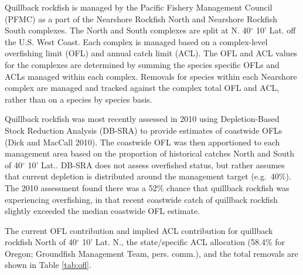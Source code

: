 \documentclass[11pt,
  english,
  a4paper,
]{article}
\begin{document}
\leavevmode\tagmcend\tagstructend


Quillback rockfish is managed by the Pacific Fishery Management Council (PFMC) as a part of the Nearshore Rockfish North and Nearshore Rockfish South complexes. The North and South complexes are split at N. 40{\(^\circ\)\leavevmode\tagmcend\tagstructend} 10' Lat. off the U.S. West Coast. Each complex is managed based on a complex-level overfishing limit (OFL) and annual catch limit (ACL). The OFL and ACL values for the complexes are determined by summing the species specific OFLs and ACLs managed within each complex. Removals for species within each Nearshore complex are managed and tracked against the complex total OFL and ACL, rather than on a species by species basis.

\leavevmode\tagmcend\tagstructend\par


Quillback rockfish was most recently assessed in 2010 using Depletion-Based Stock Reduction Analysis (DB-SRA) to provide estimates of coastwide OFLs {(Dick and MacCall 2010)\leavevmode\tagmcend\tagstructend}. The coastwide OFL was then apportioned to each management area based on the proportion of historical catches North and South of 40{\(^\circ\)\leavevmode\tagmcend\tagstructend} 10' Lat.. DB-SRA does not assess overfished status, but rather assumes that current depletion is distributed around the management target (e.g.~40\%). The 2010 assessment found there was a 52\% chance that quillback rockfish was experiencing overfishing, in that recent coastwide catch of quillback rockfish slightly exceeded the median coastwide OFL estimate.

\leavevmode\tagmcend\tagstructend\par


The current OFL contribution and implied ACL contribution for quillback rockfish North of 40{\(^\circ\)\leavevmode\tagmcend\tagstructend} 10' Lat. N., the state/specific ACL allocation (58.4\% for Oregon; Groundfish Management Team, pers. comm.), and the total removals are shown in Table \ref{tab:ofl}.
\end{document}
